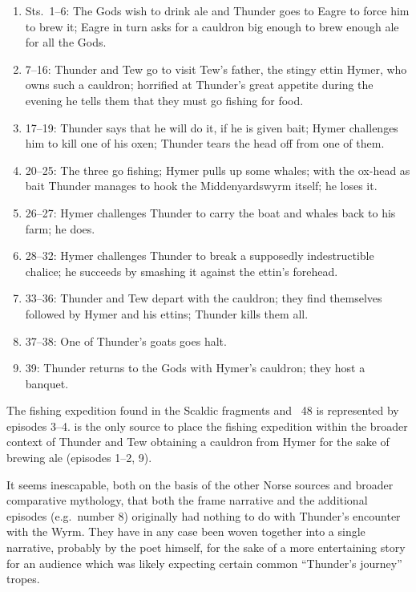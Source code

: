 \begin{enumerate}
  \item Sts.~1--6: The Gods wish to drink ale and Thunder goes to Eagre to force him to brew it; Eagre in turn asks for a cauldron big enough to brew enough ale for all the Gods.
  \item 7--16: Thunder and Tew go to visit Tew’s father, the stingy ettin Hymer, who owns such a cauldron; horrified at Thunder’s great appetite during the evening he tells them that they must go fishing for food.
  \item 17--19: Thunder says that he will do it, if he is given bait; Hymer challenges him to kill one of his oxen; Thunder tears the head off from one of them.
  \item 20--25: The three go fishing; Hymer pulls up some whales; with the ox-head as bait Thunder manages to hook the Middenyardswyrm itself; he loses it.
  \item 26--27: Hymer challenges Thunder to carry the boat and whales back to his farm; he does.
  \item 28--32: Hymer challenges Thunder to break a supposedly indestructible chalice; he succeeds by smashing it against the ettin’s forehead.
  \item 33--36: Thunder and Tew depart with the cauldron; they find themselves followed by Hymer and his ettins; Thunder kills them all.
  \item 37--38: One of Thunder’s goats goes halt.
  \item 39: Thunder returns to the Gods with Hymer’s cauldron; they host a banquet.
\end{enumerate}

The fishing expedition found in the Scaldic fragments and \Gylfaginning~48 is represented by episodes 3--4.
 is the only source to place the fishing expedition within the broader context of Thunder and Tew obtaining a cauldron from Hymer for the sake of brewing ale (episodes 1--2, 9).

It seems inescapable, both on the basis of the other Norse sources and broader comparative mythology, that both the frame narrative and the additional episodes (e.g.~number 8) originally had nothing to do with Thunder’s encounter with the Wyrm.  They have in any case been woven together into a single narrative, probably by the poet himself, for the sake of a more entertaining story for an audience which was likely expecting certain common “Thunder’s journey” tropes.

